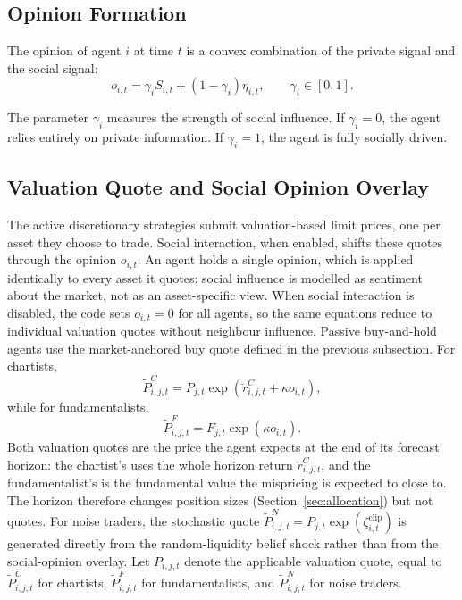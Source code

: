 \documentclass[12pt, a4paper]{article}
\begin{document}
    \subsection{Opinion Formation}

    The opinion of agent \(i\) at time \(t\) is a convex combination of the
    private signal and the social signal:
    \begin{equation}
        o_{i,t} = \gamma_i S_{i,t} + (1-\gamma_i)\eta_{i,t},
        \qquad \gamma_i \in [0,1].
    \end{equation}

    The parameter \(\gamma_i\) measures the strength of social influence. If
    \(\gamma_i=0\), the agent relies entirely on private information. If
    \(\gamma_i=1\), the agent is fully socially driven.

    \subsection{Valuation Quote and Social Opinion Overlay}

    The active discretionary strategies submit valuation-based limit prices, one
    per asset they choose to trade. Social interaction, when enabled, shifts these
    quotes through the opinion \(o_{i,t}\). An agent holds a single opinion, which
    is applied identically to every asset it quotes: social influence is modelled
    as sentiment about the market, not as an asset-specific view. When social
    interaction is disabled, the code sets \(o_{i,t}=0\) for all agents, so the
    same equations reduce to individual valuation quotes without neighbour
    influence. Passive buy-and-hold agents use the market-anchored buy quote
    defined in the previous subsection. For chartists,
    \begin{equation}
        \tilde P_{i,j,t}^{C}=P_{j,t}\exp\!\left(\breve r_{i,j,t}^{C}+\kappa o_{i,t}\right),
    \end{equation}
    while for fundamentalists,
    \begin{equation}
        \tilde P_{i,j,t}^{F}=F_{j,t}\exp\!\left(\kappa o_{i,t}\right).
    \end{equation}
    Both valuation quotes are the price the agent expects at the end of its
    forecast horizon: the chartist's uses the whole horizon return
    \(\breve r_{i,j,t}^{C}\), and the fundamentalist's is the fundamental value
    the mispricing is expected to close to. The horizon therefore changes
    position sizes (Section~\ref{sec:allocation}) but not quotes.
    For noise traders, the stochastic quote
    \(\tilde P_{i,j,t}^{N}=P_{j,t}\exp(\zeta_{i,t}^{\mathrm{clip}})\) is generated
    directly from the random-liquidity belief shock rather than from the
    social-opinion overlay.
    Let \(\tilde P_{i,j,t}\) denote the applicable valuation quote, equal to
    \(\tilde P_{i,j,t}^{C}\) for chartists, \(\tilde P_{i,j,t}^{F}\) for
    fundamentalists, and \(\tilde P_{i,j,t}^{N}\) for noise traders.
\end{document}
